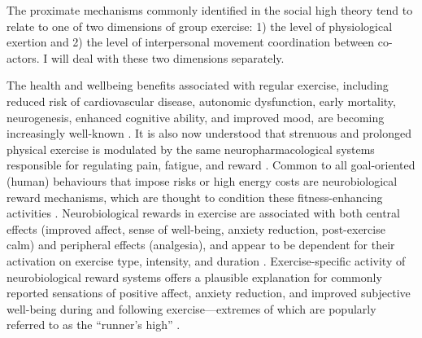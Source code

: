 \begin{CJK}{UTF8}{gbsn}
The proximate mechanisms commonly identified in the social high theory tend to relate to one of two dimensions of group exercise: 1) the level of physiological exertion and 2) the level of interpersonal movement coordination between co-actors.  I will deal with these two dimensions separately.

The health and wellbeing benefits associated with regular exercise, including reduced risk of cardiovascular disease, autonomic dysfunction, early mortality, neurogenesis, enhanced cognitive ability, and improved mood, are becoming increasingly well-known \citep{Blair1994,Nagamatsu2014}.  It is also now understood that strenuous and prolonged physical exercise is modulated by the same neuropharmacological systems responsible for regulating pain, fatigue, and reward \citep{Boecker2008,Raichlen2013}.  Common to all goal-oriented (human) behaviours that impose risks or high energy costs are neurobiological reward mechanisms, which are thought to condition these fitness-enhancing activities \citep{Burgdorf2006}.  Neurobiological rewards in exercise are associated with both central effects (improved affect, sense of well-being, anxiety reduction, post-exercise calm) and peripheral effects (analgesia), and appear to be dependent for their activation on exercise type, intensity, and duration \citep{Dietrich2004}.  Exercise-specific activity of neurobiological reward systems offers a plausible explanation for commonly reported sensations of positive affect, anxiety reduction, and improved subjective well-being during and following exercise---extremes of which are popularly referred to as the ``runner's high'' \citep{(Dietrich2004,Boecker2008,Raichlen2012}.


\end{CJK}
